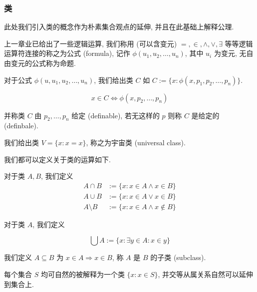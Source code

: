 \subsubsection{类}

此处我们引入类的概念作为朴素集合观点的延伸, 并且在此基础上解释公理.

上一章业已给出了一些逻辑运算, 我们称用 (可以含变元) \(=, \in, \wedge,\vee,\exists\) 等等逻辑
运算符连接的称之为公式 (formula), 记作 \(\phi(u_1, u_2, \dots, u_n)\), 其中 \(u_i\) 为变元, 无自由变元的公式称为命题.

\begin{definition}
    对于公式 \(\phi(u, u_1, u_2, \dots, u_n)\), 我们给出类 \(C\) 如 \(C := \{x : \phi(x, p_1, p_2, \dots, p_n)\}\).

    \[
        x \in C \Leftrightarrow \phi(x, p_2, \dots, p_n)
    \]

    并称类 \(C\) 由 \(p_2, \dots, p_n\) 给定 (definable), 若无这样的 \(p\) 则称 \(C\) 是给定的 (definbale).
\end{definition}

\begin{definition}
    我们给出类 \(V = \{x : x = x\}\), 称之为宇宙类 (universal class).
\end{definition}

我们都可以定义关于类的运算如下.

\begin{definition}
    对于类 \(A, B\), 我们定义
    \begin{align}
        A \cap B &:= \{x : x \in A \wedge x \in B\} \\
        A \cup B &:= \{x : x \in A \vee x \in B\} \\
        A \setminus B &:= \{x : x \in A \wedge x \notin B\}
    \end{align}

    对于类 \(A\), 我们定义

    \begin{equation}
        \bigcup A := \{x : \exists y \in A : x \in y\}
    \end{equation}
\end{definition}

\begin{definition}
    我们定义 \(A \subseteq B\) 为 \(x \in A \Rightarrow x \in B\), 称 \(A\) 是 \(B\) 的子类 (subclass).
\end{definition}

每个集合 \(S\) 均可自然的被解释为一个类 \(\{x : x \in S\}\), 并交等从属关系自然可以延伸到集合上.


